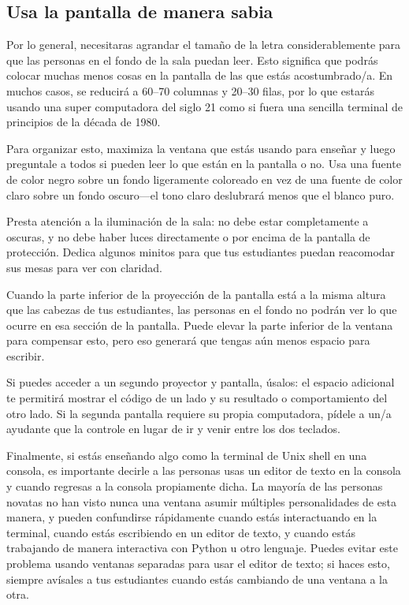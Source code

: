 \subsection*{Usa la pantalla de manera sabia}

Por lo general, necesitaras agrandar el tamaño de la letra considerablemente
para que las personas en el fondo de la sala puedan leer. 
Esto significa que podrás colocar muchas menos cosas en la pantalla de las que estás acostumbrado/a.
En muchos casos, se reducirá a 60--70 columnas y 20--30 filas,
por lo que estarás usando una super computadora del siglo 21
como si fuera una sencilla terminal de principios de la década de 1980.

Para organizar esto,
maximiza la ventana que estás usando para enseñar
y luego preguntale a todos si pueden leer lo que están en la pantalla o no.
Usa una fuente de color negro sobre un fondo ligeramente coloreado en vez de una fuente de color claro sobre un fondo oscuro---el tono claro deslubrará 
menos que el blanco puro.

Presta atención a la iluminación de la sala:
no debe estar completamente a oscuras, y no debe haber luces directamente 
o por encima de la pantalla de protección.
Dedica algunos minitos para que tus estudiantes puedan reacomodar sus mesas
para ver con claridad.

Cuando la parte inferior de la proyección de la pantalla está a la misma altura que las cabezas de tus estudiantes,
las personas en el fondo no podrán ver lo que ocurre en esa sección de la pantalla.
Puede elevar la parte inferior de la ventana para compensar esto,
pero eso generará que tengas aún menos espacio para escribir.

Si puedes acceder a un segundo proyector y pantalla,
úsalos:
el espacio adicional te permitirá mostrar el código de un lado
y su resultado o comportamiento del otro lado.
Si la segunda pantalla requiere su propia computadora,
pídele a un/a ayudante que la controle
en lugar de ir y venir entre los dos teclados.

Finalmente,
si estás enseñando algo como la terminal de Unix shell en una consola,
es importante decirle a las personas usas un editor de texto en la consola
y cuando regresas a la consola propiamente dicha.
La mayoría de las personas novatas no han visto nunca una ventana asumir múltiples personalidades de esta manera,
y pueden confundirse rápidamente
cuando estás interactuando en la terminal,
cuando estás escribiendo en un editor de texto,
y cuando estás trabajando de manera interactiva con Python u otro lenguaje.
Puedes evitar este problema usando ventanas separadas para usar el editor de texto;
si haces esto,
siempre avísales a tus estudiantes cuando estás cambiando de una ventana a la otra.


